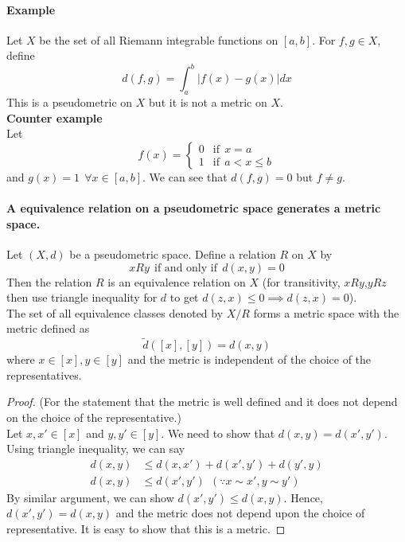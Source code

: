 \documentclass[12pt]{report}
\begin{document}
\paragraph*{Example}
Let $X$ be the set of all Riemann integrable functions on $[a,b]$. For $f,g \in X$, define
$$ d(f,g) = \int_a^b |f(x) - g(x)| dx$$
This is a pseudometric on $X$ but it is not a metric on $X$.\\
\textbf{Counter example}\\
Let
$$ 
f(x) = \begin{cases}
        0 & \text{if}~~x=a\\
        1 & \text{if}~~a < x \leq b
    \end{cases}
$$
and $g(x) = 1~~\forall x \in [a,b]$. We can see that $d(f,g) = 0$ but $f \neq g$.
\paragraph*{A equivalence relation on a pseudometric space generates a metric space. } Let $(X,d)$ be a pseudometric space. Define a relation $R$ on $X$ by 
$$ xRy~~\text{if and only if}~~ d(x,y) = 0$$
Then the relation $R$ is an equivalence relation on $X$ (for transitivity, $xRy$,$yRz$ then use triangle inequality for $d$ to get $d(z,x) \leq 0 \implies d(z,x) = 0$).\\
The set of all equivalence classes denoted by $X/R$ forms a metric space with the metric defined as
$$ \tilde{d}([x],[y]) = d(x,y)$$
where $x \in [x],y \in [y]$ and the metric is independent of the choice of the representatives.
\begin{proof}
    (For the statement that the metric is well defined and it does not depend on the choice of the representative.)\\
    Let $x,x' \in [x]$ and $y,y' \in [y]$. We need to show that $d(x,y) = d(x',y')$. Using triangle inequality, we can say
    \begin{align*}
        d(x,y) &\leq d(x,x') + d(x',y') + d(y',y)\\
        d(x,y) &\leq d(x',y')~~(\because x \sim x', y \sim y')
    \end{align*}
    By similar argument, we can show $d(x',y') \leq d(x,y)$. Hence, $d(x',y') = d(x,y)$ and the metric does not depend upon the choice of representative. It is easy to show that this is a metric.
\end{proof}
\end{document}
